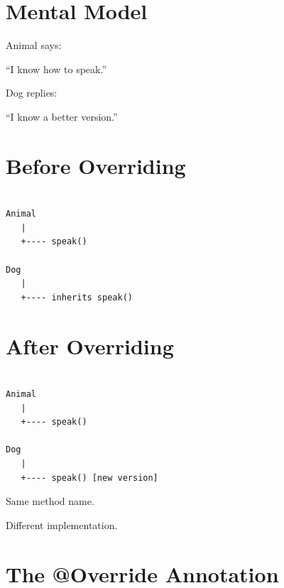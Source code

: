 \documentclass[11pt,a4paper]{book}
\begin{document}

\section{Mental Model}

\begin{mentalmodel}

Animal says:

``I know how to speak.''

Dog replies:

``I know a better version.''

\end{mentalmodel}


\section{Before Overriding}

\begin{verbatim}

Animal
   |
   +---- speak()

Dog
   |
   +---- inherits speak()

\end{verbatim}


\section{After Overriding}

\begin{verbatim}

Animal
   |
   +---- speak()

Dog
   |
   +---- speak() [new version]

\end{verbatim}


Same method name.

Different implementation.


\section{The @Override Annotation}
\end{document}
